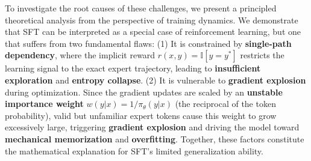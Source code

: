
To investigate the root causes of these challenges, we present a principled theoretical analysis from the perspective of training dynamics. We demonstrate that SFT can be interpreted as a special case of reinforcement learning, but one that suffers from two fundamental flaws: (1) It is constrained by \textbf{single-path dependency}, where the implicit reward $r(x,y)=\mathbb{I}[y=y^{*}]$ restricts the learning signal to the exact expert trajectory, leading to \textbf{insufficient exploration} and \textbf{entropy collapse}. (2) It is vulnerable to \textbf{gradient explosion} during optimization. Since the gradient updates are scaled by an \textbf{unstable importance weight} $w(y|x)=1/\pi_{\theta}(y|x)$ (the reciprocal of the token probability), valid but unfamiliar expert tokens cause this weight to grow excessively large, triggering \textbf{gradient explosion} and driving the model toward \textbf{mechanical memorization} and \textbf{overfitting}. Together, these factors constitute the mathematical explanation for SFT's limited generalization ability.

